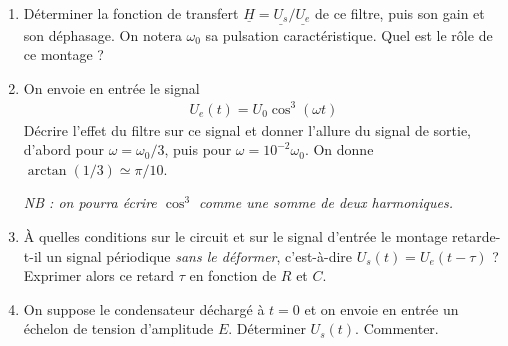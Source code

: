\begin{enumerate}

	\item Déterminer la fonction de transfert $\underline{H}=\underline{U_s}/\underline{U_e}$ de ce filtre, puis son gain et son déphasage. On notera $\omega_0$ sa pulsation caractéristique. Quel est le rôle de ce montage ?

	\item On envoie en entrée le signal
	\begin{align*}
		U_e(t)=U_0\cos^3(\omega t)
	\end{align*}
	Décrire l'effet du filtre sur ce signal et donner l'allure du signal de sortie, d'abord pour $\omega=\omega_0/3$, puis pour $\omega=10^{-2}\omega_0$. On donne $\arctan(1/3)\simeq\pi/10$.

	\textit{NB : on pourra écrire $\cos^3$ comme une somme de deux harmoniques.}

	\item À quelles conditions sur le circuit et sur le signal d'entrée le montage retarde-t-il un signal périodique \textit{sans le déformer}, c'est-à-dire $U_s(t)=U_e(t-\tau)$ ? Exprimer alors ce retard $\tau$ en fonction de $R$ et $C$.

	\item On suppose le condensateur déchargé à $t=0$ et on envoie en entrée un échelon de tension d'amplitude $E$. Déterminer $U_s(t)$. Commenter.

\end{enumerate}

\newpage

